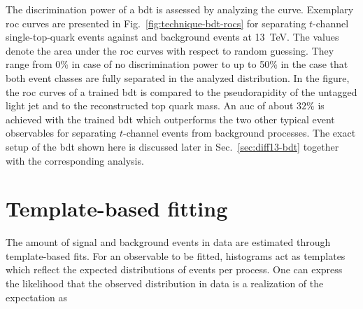 The discrimination power of a \gls{bdt} is assessed by analyzing the  curve. Exemplary \gls{roc} curves are presented in Fig.~\ref{fig:technique-bdt-rocs} for separating $t$-channel single-top-quark events against \wjets and \ttbar background events at 13~TeV. The  values denote the area under the \gls{roc} curves with respect to random guessing. They range from 0\% in case of no discrimination power to up to 50\% in the case that both event classes are fully separated in the analyzed distribution. In the figure, the \gls{roc} curves of a trained \gls{bdt} is compared to the pseudorapidity of the untagged light jet and to the reconstructed top quark mass. An \gls{auc} of about $32\%$ is achieved with the trained \gls{bdt} which outperforms the two other typical event observables for separating $t$-channel events from background processes. The exact setup of the \gls{bdt} shown here is discussed later in Sec.~\ref{sec:diff13-bdt} together with the corresponding analysis.



\section{Template-based fitting}
\label{sec:technique-fitting}

The amount of signal and background events in data are estimated through template-based  fits. For an observable to be fitted, histograms act as templates which reflect the expected distributions of events per process. One can express the likelihood that the observed distribution in data is a realization of the  expectation as

